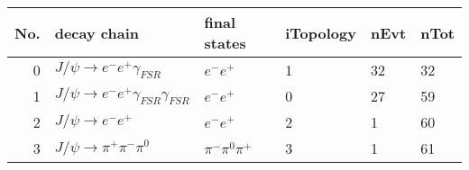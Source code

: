 \begin{table}[htbp] 
\begin{center}
\begin{small}
\begin{tabular}{rlllll}\hline\hline
 No. & decay chain & final states &  iTopology & nEvt & nTot \\\hline
  0&$J/\psi       \rightarrow e^{-}        e^{+}        \gamma_{FSR} $&$e^{-}        e^{+}        $&    1&   32&   32\\
  1&$J/\psi       \rightarrow e^{-}        e^{+}        \gamma_{FSR} \gamma_{FSR} $&$e^{-}        e^{+}        $&    0&   27&   59\\
  2&$J/\psi       \rightarrow e^{-}        e^{+}        $&$e^{-}        e^{+}        $&    2&    1&   60\\
  3&$J/\psi       \rightarrow \pi^{+}        \pi^{-}        \pi^{0}        $&$\pi^{-}        \pi^{0}        \pi^{+}        $&    3&    1&   61\\

\hline\hline
\end{tabular}
\end{small}
\caption{ }
\end{center}
\end{table}


